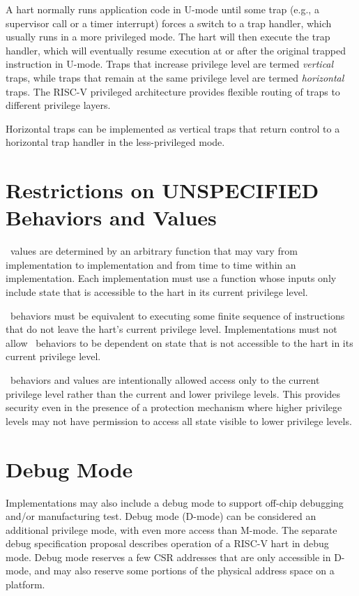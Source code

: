 A hart normally runs application code in U-mode until some trap (e.g.,
a supervisor call or a timer interrupt) forces a switch to a trap
handler, which usually runs in a more privileged mode. The hart will
then execute the trap handler, which will eventually resume execution
at or after the original trapped instruction in U-mode.  Traps that
increase privilege level are termed {\em vertical} traps, while traps
that remain at the same privilege level are termed {\em horizontal}
traps.  The RISC-V privileged architecture provides flexible routing
of traps to different privilege layers.

\begin{commentary}
Horizontal traps can be implemented as vertical traps that
return control to a horizontal trap handler in the less-privileged mode.
\end{commentary}

\section{Restrictions on UNSPECIFIED Behaviors and Values}

\unspecified\ values are determined by an arbitrary function that may
vary from implementation to implementation and from time to time
within an implementation.  Each implementation must use a function
whose inputs only include state that is accessible to the hart in its
current privilege level.

\unspecified\ behaviors must be equivalent to executing some finite
sequence of instructions that do not leave the hart's current privilege
level.  Implementations must not allow \unspecified\ behaviors to be
dependent on state that is not accessible to the hart in its current
privilege level.

\begin{commentary}
\unspecified\ behaviors and values are intentionally allowed access
only to the current privilege level rather than the current and lower
privilege levels.  This provides security even in the presence of a
protection mechanism where higher privilege levels may not have
permission to access all state visible to lower privilege levels.
\end{commentary}


\section{Debug Mode}

Implementations may also include a debug mode to support off-chip
debugging and/or manufacturing test.  Debug mode (D-mode) can be
considered an additional privilege mode, with even more access than
M-mode. The separate debug specification proposal describes operation
of a RISC-V hart in debug mode.  Debug mode reserves a few CSR
addresses that are only accessible in D-mode, and may also reserve
some portions of the physical address space on a platform.
